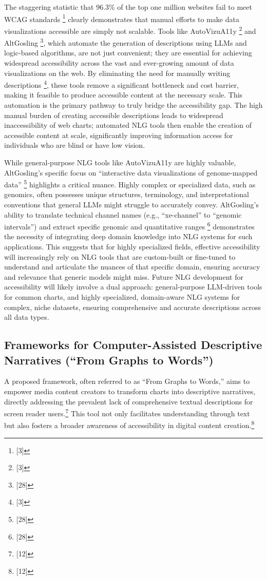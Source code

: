 The staggering statistic that 96.3\% of the top one million websites fail to meet WCAG standards \footnote{[3]} clearly demonstrates that manual efforts to make data visualizations accessible are simply not scalable. Tools like AutoVizuA11y \footnote{[3]} and AltGosling \footnote{[28]}, which automate the generation of descriptions using LLMs and logic-based algorithms, are not just convenient; they are essential for achieving widespread accessibility across the vast and ever-growing amount of data visualizations on the web. By eliminating the need for manually writing descriptions \footnote{[3]}, these tools remove a significant bottleneck and cost barrier, making it feasible to produce accessible content at the necessary scale. This automation is the primary pathway to truly bridge the accessibility gap. The high manual burden of creating accessible descriptions leads to widespread inaccessibility of web charts; automated NLG tools then enable the creation of accessible content at scale, significantly improving information access for individuals who are blind or have low vision.

While general-purpose NLG tools like AutoVizuA11y are highly valuable, AltGosling's specific focus on ``interactive data visualizations of genome-mapped data'' \footnote{[28]} highlights a critical nuance. Highly complex or specialized data, such as genomics, often possesses unique structures, terminology, and interpretational conventions that general LLMs might struggle to accurately convey. AltGosling's ability to translate technical channel names (e.g., ``xe-channel'' to ``genomic intervals'') and extract specific genomic and quantitative ranges \footnote{[28]} demonstrates the necessity of integrating deep domain knowledge into NLG systems for such applications. This suggests that for highly specialized fields, effective accessibility will increasingly rely on NLG tools that are custom-built or fine-tuned to understand and articulate the nuances of that specific domain, ensuring accuracy and relevance that generic models might miss. Future NLG development for accessibility will likely involve a dual approach: general-purpose LLM-driven tools for common charts, and highly specialized, domain-aware NLG systems for complex, niche datasets, ensuring comprehensive and accurate descriptions across all data types.

\subsection{Frameworks for Computer-Assisted Descriptive Narratives (``From Graphs to Words'')}
A proposed framework, often referred to as ``From Graphs to Words,'' aims to empower media content creators to transform charts into descriptive narratives, directly addressing the prevalent lack of comprehensive textual descriptions for screen reader users.\footnote{[12]} This tool not only facilitates understanding through text but also fosters a broader awareness of accessibility in digital content creation.\footnote{[12]}

